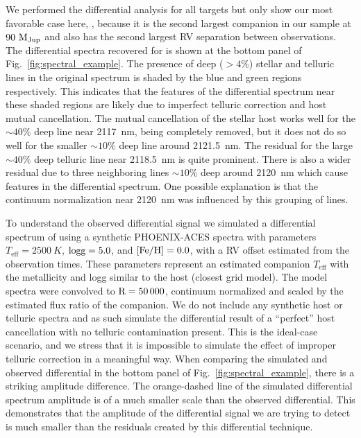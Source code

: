 We performed the differential analysis for all targets but only show our most favorable case here, , because it is the second largest companion in our sample at \(\rm 90~M_{Jup}\) and also has the second largest RV separation between observations. The differential spectra recovered for  is shown at the bottom panel of Fig.~\ref{fig:spectral_example}. The presence of deep (\(>4\% \)) stellar and telluric lines in the original spectrum is shaded by the blue and green regions respectively. This indicates that the features of the differential spectrum near these shaded regions are likely due to imperfect telluric correction and host mutual cancellation.
The mutual cancellation of the stellar host works well for the \(\sim40\% \) deep line near 2117~nm, being completely removed, but it does not do so well for the smaller \(\sim10\% \) deep line around 2121.5~nm. The residual for the large \(\sim40\% \) deep telluric line near 2118.5~nm is quite prominent. There is also a wider residual due to three neighboring lines \(\sim10\% \) deep around 2120~nm which cause features in the differential spectrum. One possible explanation is that the continuum normalization near 2120~nm was influenced by this grouping of lines.

To understand the observed differential signal we simulated a differential spectrum of  using a synthetic PHOENIX-ACES spectra with parameters \(T_{\textrm{eff}} = 2500~K \), \(\rm logg=5.0 \), and \(\rm [Fe/H]=0.0 \), with a RV offset estimated from the observation times. These parameters represent an estimated companion \(T_{\textrm{eff}} \) with the metallicity and logg similar to the host (closest grid model). The model spectra were convolved to \(\rm R=50\,000 \), continuum normalized and scaled by the estimated flux ratio of the companion. We do not include any synthetic host or telluric spectra and as such simulate the differential result of a ``perfect'' host cancellation with no telluric contamination present. This is the ideal-case scenario, and we stress that it is impossible to simulate the effect of improper telluric correction in a meaningful way. When comparing the simulated and observed differential in the bottom panel of Fig.~\ref{fig:spectral_example}, there is a striking amplitude difference. The orange-dashed line of the simulated differential spectrum amplitude is of a much smaller scale than the observed differential. This demonstrates that the amplitude of the differential signal we are trying to detect is much smaller than the residuals created by this differential technique.

